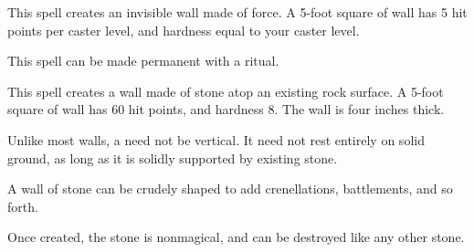 \begin{spellheader}
    \spelldur{\durshort \dismissable}
\end{spellheader}
\begin{spelleffects}
    \spelleffect This spell creates an invisible wall made of force. A 5-foot square of wall has 5 hit points per caster level, and hardness equal to your caster level.
\end{spelleffects}
\begin{spellfooter}
    \spellnotes \forcespellnotes

    This spell can be made permanent with a  ritual.
\end{spellfooter}

\begin{spellheader}
\end{spellheader}
\begin{spelleffects}
    \spelleffect This spell creates a wall made of stone atop an existing rock surface. A 5-foot square of wall has 60 hit points, and hardness 8. The wall is four inches thick.
    \par Unlike most walls, a  need not be vertical. It need not rest entirely on solid ground, as long as it is solidly supported by existing stone.
    \par A wall of stone can be crudely shaped to add crenellations, battlements, and so forth.
\end{spelleffects}
\begin{spellfooter}
    \spellnotes Once created, the stone is nonmagical, and can be destroyed like any other stone.
\end{spellfooter}

